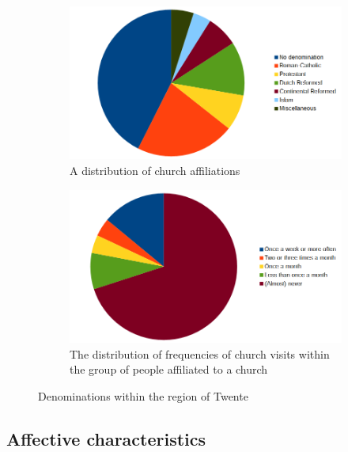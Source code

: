 \begin{figure}
    \centering
    \begin{subfigure}[b]{0.7\textwidth}
        \includegraphics[width=\textwidth]{img/denominations.png}
        \begin{center}
            \caption{A distribution of church affiliations}
        \end{center}
        \label{fig:denominations}
    \end{subfigure}
    \begin{subfigure}[b]{0.7\textwidth}
        \includegraphics[width=\textwidth]{img/churchvisits.png}
        \begin{center}
            \caption{The distribution of frequencies of church visits within the group of people affiliated to a church}
        \end{center}
        \label{fig:churchvisits}
    \end{subfigure}
    \caption{Denominations within the region of Twente \protect\cite{cbsdenom}}
\end{figure}

\subsection{Affective characteristics}

